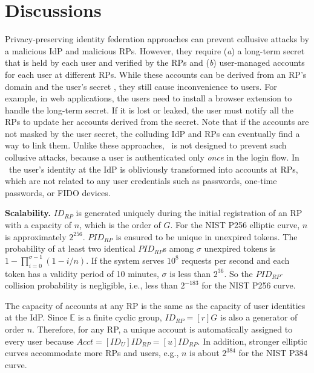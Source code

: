 \section{Discussions}
\label{sec:discussion}

Privacy-preserving identity federation approaches \cite{ELPASSO, UnlimitID, idemix, PseudoID, Opaak, uprov} can prevent collusive attacks by a malicious IdP and malicious RPs.
However, they require (\emph{a}) a long-term secret that is held by each user and verified by the RPs and (\emph{b}) user-managed accounts for each user at different RPs.
While these accounts can be derived from an RP's domain and the user's secret \cite{ELPASSO, UnlimitID, Opaak, uprov,idemix},
 they still cause inconvenience to users.
For example, in web applications, the users need to install a browser extension to handle the long-term secret.
If it is lost or leaked, the user must notify all the RPs to update her accounts derived from the secret.
Note that if the accounts are not masked by the user secret,
 the colluding IdP and RPs can eventually find a way to link them.
Unlike these approaches, \usso\ is not designed to prevent such collusive attacks,
 because a user is authenticated only \emph{once} in the login flow.
In \usso\ the user's identity at the IdP is obliviously transformed into accounts at RPs,
 which are not related to any user credentials such as passwords, one-time passwords, %
  or FIDO devices.

\noindent \textbf{Scalability.}
$ID_{RP}$ is generated uniquely during the initial registration of an RP with a capacity of $n$, which is the order of $G$. For the NIST P256 elliptic curve, $n$ is approximately $2^{256}$.
$PID_{RP}$ is ensured to be unique in unexpired tokens.
The probability of at least two identical $PID_{RP}$s among $\sigma$ unexpired tokens is $1-\prod_{i=0}^{\sigma-1}(1-i/n)$.
If the system serves $10^{8}$ requests per second and each token has a validity period of 10 minutes, $\sigma$ is less than $2^{36}$. So the $PID_{RP}$-collision probability is negligible, i.e., less than $2^{-183}$ for the NIST P256 curve.

The capacity of accounts at any RP is the same as the capacity of user identities at the IdP.
Since $\mathbb{E}$ is a finite cyclic group, $ID_{RP} = [r]G$ is also a generator of order $n$.
Therefore, for any RP, a unique account is automatically assigned to every user because $Acct =  [ID_U]ID_{RP} = [u]ID_{RP}$.
In addition, stronger elliptic curves accommodate more RPs and users, e.g., $n$ is about $2^{384}$ for the NIST P384 curve.


